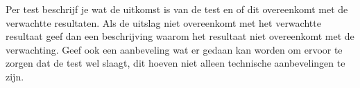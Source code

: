 Per test beschrijf je wat de uitkomst is van de test en of dit overeenkomt met de verwachtte resultaten. Als de uitslag niet overeenkomt met het verwachtte resultaat geef dan een beschrijving waarom het resultaat niet overeenkomt met de verwachting. Geef ook een aanbeveling wat er gedaan kan worden om ervoor te zorgen dat de test wel slaagt, dit hoeven niet alleen technische aanbevelingen te zijn.
